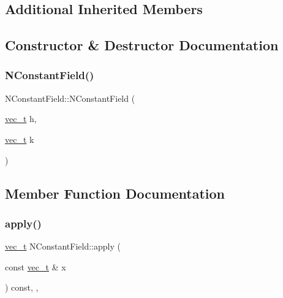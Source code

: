 \subsection*{Additional Inherited Members}


\subsection{Constructor \& Destructor Documentation}
\mbox{\label{class_n_constant_field_a0bf33435d6fb4f605c1c85cf0d9ff770}} 
\subsubsection{\texorpdfstring{NConstantField()}{NConstantField()}}
{\footnotesize\ttfamily N\+Constant\+Field\+::\+N\+Constant\+Field (\begin{DoxyParamCaption}\item[{\mbox{\hyperlink{_n_vector_8h_a0a2cfc67e738a3d73e4f12098c4c07f6}{vec\+\_\+t}}}]{h,  }\item[{\mbox{\hyperlink{_n_vector_8h_a0a2cfc67e738a3d73e4f12098c4c07f6}{vec\+\_\+t}}}]{k }\end{DoxyParamCaption})}



\subsection{Member Function Documentation}
\mbox{\label{class_n_constant_field_a2b81a6a4f9fa56580002d180ac769c9b}} 
\subsubsection{\texorpdfstring{apply()}{apply()}}
{\footnotesize\ttfamily \mbox{\hyperlink{_n_vector_8h_a0a2cfc67e738a3d73e4f12098c4c07f6}{vec\+\_\+t}} N\+Constant\+Field\+::apply (\begin{DoxyParamCaption}\item[{const \mbox{\hyperlink{_n_vector_8h_a0a2cfc67e738a3d73e4f12098c4c07f6}{vec\+\_\+t}} \&}]{x }\end{DoxyParamCaption}) const\hspace{0.3cm}{\ttfamily [override]}, {\ttfamily [protected]}, {\ttfamily [virtual]}}



